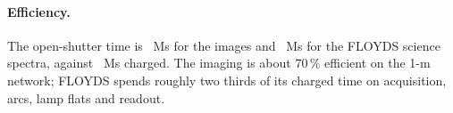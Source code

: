 \paragraph{Efficiency.} The open-shutter time is \expImagesMs~Ms for the images and \expSpectraMs~Ms for the FLOYDS
science spectra, against \msTotal~Ms charged. The imaging is about 70\,\% efficient on the 1-m network;
FLOYDS spends roughly two thirds of its charged time on acquisition, arcs, lamp flats and readout.
